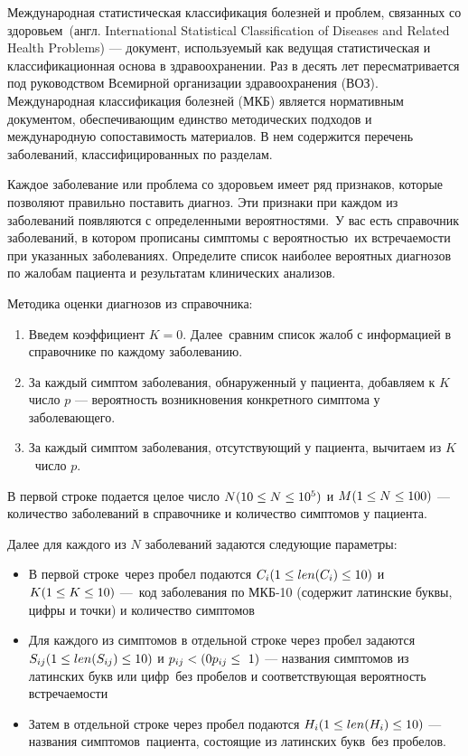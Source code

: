 
Международная статистическая классификация болезней и проблем, связанных со здоровьем (англ. International Statistical Classification of Diseases and Related Health Problems) — документ, используемый как ведущая статистическая и классификационная основа в здравоохранении. Раз в десять лет пересматривается под руководством Всемирной организации здравоохранения (ВОЗ). Международная классификация болезней (МКБ) является нормативным документом, обеспечивающим единство методических подходов и международную сопоставимость материалов. В нем содержится перечень заболеваний, классифицированных по разделам. 

Каждое заболевание или проблема со здоровьем имеет ряд признаков, которые позволяют правильно поставить диагноз. Эти признаки при каждом из заболеваний появляются с определенными вероятностями. У вас есть справочник заболеваний, в котором прописаны симптомы с вероятностью их встречаемости при указанных заболеваниях. Определите список наиболее вероятных диагнозов по жалобам пациента и результатам клинических анализов.

Методика оценки диагнозов из справочника:

\begin{enumerate}
    \item Введем коэффициент $K = 0$. Далее сравним список жалоб с информацией в справочнике по каждому заболеванию.
    \item За каждый симптом заболевания, обнаруженный у пациента, добавляем к $K$ число $p$ — вероятность возникновения конкретного симптома у заболевающего.
    \item За каждый симптом заболевания, отсутствующий у пациента, вычитаем из $K$ число $p$.
\end{enumerate}


В первой строке подается целое число $N\space (10\leq N \leq 10^5)$ и $M\space (1\leq N \leq 100) $ — количество заболеваний в справочнике и количество симптомов у пациента. 

Далее для каждого из $N$ заболеваний задаются следующие параметры:
\begin{itemize}
\item В первой строке через пробел подаются $C_i\space(1\leq len(C_i) \leq 10)$ и $K\space(1\leq K \leq 10)$ — код заболевания по МКБ-10 (содержит латинские буквы, цифры и точки) и количество симптомов 
\item Для каждого из симптомов в отдельной строке через пробел задаются $S_{ij}\space (1\leq len(S_{ij}) \leq 10)$ и $p_{ij} < \space (0 p_{ij} \leq 1)$ — названия симптомов из латинских букв или цифр без пробелов и соответствующая вероятность встречаемости
\item Затем в отдельной строке через пробел подаются $H_{i}\space(1\leq len(H_{i}) \leq 10)$ — названия симптомов пациента, состоящие из латинских букв без пробелов.
\end{itemize}

